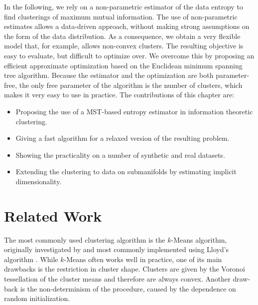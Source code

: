 In the following, we rely on a non-parametric estimator of the data entropy to find 
clusterings of maximum mutual information.
%
The use of non-parametric estimates allows a data-driven approach, without 
making strong assumptions on the form of the data distribution.
%
As a consequence, we obtain a very flexible model that, for example, allows 
non-convex clusters.
%
The resulting objective is easy to evaluate, but difficult to optimize
over. We overcome this by proposing an efficient approximate optimization
based on the Euclidean minimum spanning tree algorithm. 
%
Because the estimator and the optimization are both parameter-free, 
the only free parameter of the algorithm is the number of clusters, 
which makes it very easy to use in practice.
%
The contributions of this chapter are:
\begin{itemize}
    \item Proposing the use of a MST-based entropy estimator in information theoretic clustering.
    \item Giving a fast algorithm for a relaxed version of the resulting problem.
    \item Showing the practicality on a number of synthetic and real datasets.
    \item Extending the clustering to data on submanifolds by estimating implicit dimensionality.
\end{itemize}

%


\section{Related Work}
The most commonly used clustering algorithm is the $k$-Means algorithm, originally
investigated by \citet{macqueen1967some} and most commonly implemented using
Lloyd's algorithm \citep{macqueen1967some,lloyd1982least}. While
$k$-Means often works well in practice, one of its main drawbacks is the
restriction in cluster shape. 
%
Clusters are given by the Voronoi tessellation of the cluster means and
therefore are always convex.  Another draw-back is the non-determinism of the
procedure, caused by the dependence on random initialization.

